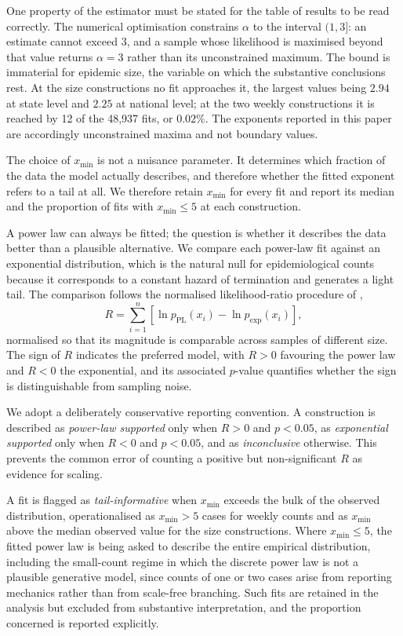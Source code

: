 \documentclass[english,10pt,b5paper]{article}
\begin{document}
One property of the estimator must be stated for the table of results to be read
correctly. The numerical optimisation constrains $\alpha$ to the interval
$(1, 3]$: an estimate cannot exceed $3$, and a sample whose likelihood is
maximised beyond that value returns $\alpha=3$ rather than its unconstrained
maximum. The bound is immaterial for epidemic size, the variable on which the
substantive conclusions rest. At the size constructions no fit approaches it, the
largest values being $2.94$ at state level and $2.25$ at national level; at the
two weekly constructions it is reached by 12 of the 48{,}937 fits, or
$0.02\%$. The exponents reported in this paper are accordingly unconstrained
maxima and not boundary values.

The choice of $x_{\min}$ is not a nuisance parameter. It determines which
fraction of the data the model actually describes, and therefore whether the
fitted exponent refers to a tail at all. We therefore retain $x_{\min}$ for every
fit and report its median and the proportion of fits with $x_{\min} \le 5$ at
each construction.

A power law can always be fitted; the question is whether it describes the data
better than a plausible alternative. We compare each power-law fit against an
exponential distribution, which is the natural null for epidemiological counts
because it corresponds to a constant hazard of termination and generates a light
tail. The comparison follows the normalised likelihood-ratio procedure of
\citet{clauset2009power},
%
\begin{equation}
R = \sum_{i=1}^{n}\left[\ln p_{\mathrm{PL}}(x_i) - \ln p_{\mathrm{exp}}(x_i)\right],
\label{eq:lr}
\end{equation}
%
normalised so that its magnitude is comparable across samples of different size.
The sign of $R$ indicates the preferred model, with $R>0$ favouring the power law
and $R<0$ the exponential, and its associated $p$-value quantifies whether the
sign is distinguishable from sampling noise.

We adopt a deliberately conservative reporting convention. A construction is
described as \emph{power-law supported} only when $R>0$ and $p<0.05$, as
\emph{exponential supported} only when $R<0$ and $p<0.05$, and as
\emph{inconclusive} otherwise. This prevents the common error of counting a
positive but non-significant $R$ as evidence for scaling.

A fit is flagged as \emph{tail-informative} when $x_{\min}$ exceeds the bulk
of the observed distribution, operationalised as $x_{\min}>5$ cases for weekly
counts and as $x_{\min}$ above the median observed value for the size
constructions. Where $x_{\min} \le 5$, the fitted power law is being asked to
describe the entire empirical distribution, including the small-count regime
in which the discrete power law is not a plausible generative model, since
counts of one or two cases arise from reporting mechanics rather than from
scale-free branching. Such fits are retained in the analysis but excluded from
substantive interpretation, and the proportion concerned is reported
explicitly.
\end{document}
